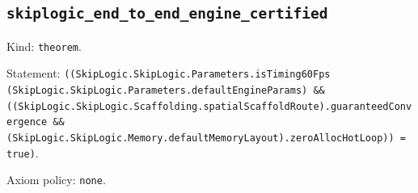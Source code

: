 \documentclass[11pt]{article}
\begin{document}
\subsection*{\texttt{skiplogic\_end\_to\_end\_engine\_certified}}
\noindent Kind: \texttt{theorem}.\par
\noindent Statement: \texttt{((SkipLogic.SkipLogic.Parameters.isTiming60Fps (SkipLogic.SkipLogic.Parameters.defaultEngineParams) \&\& ((SkipLogic.SkipLogic.Scaffolding.spatialScaffoldRoute).guaranteedConvergence \&\& (SkipLogic.SkipLogic.Memory.defaultMemoryLayout).zeroAllocHotLoop)) = true)}.\par
\noindent Axiom policy: \texttt{none}.\par
\end{document}
